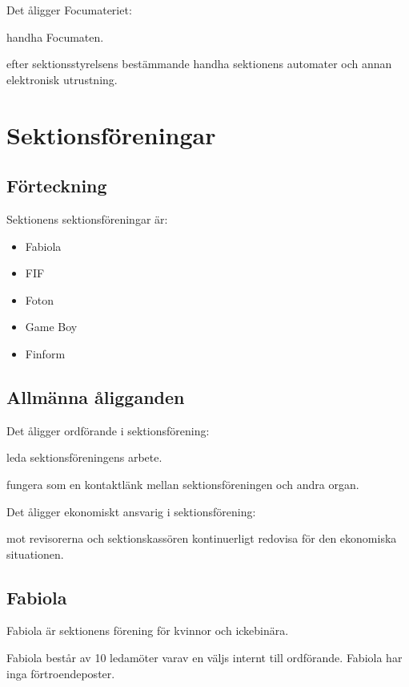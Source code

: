 \documentclass{styrdokument}
\begin{document}
\? Det åligger Focumateriet:
\begin{aligganden}
    \item handha Focumaten.
    \item efter sektionsstyrelsens bestämmande handha sektionens automater och annan elektronisk utrustning.
\end{aligganden}

\section{Sektionsföreningar}
\subsection{Förteckning}
\? Sektionens sektionsföreningar är:
\begin{itemize}
    \item Fabiola
	\item FIF
	\item Foton
	\item Game Boy
	\item Finform
\end{itemize}

\subsection{Allmänna åligganden}
\? Det åligger ordförande i sektionsförening:
\begin{aligganden}
    \item leda sektionsföreningens arbete.
    \item fungera som en kontaktlänk mellan sektionsföreningen och andra organ.
\end{aligganden}

\? Det åligger ekonomiskt ansvarig i sektionsförening:
\begin{aligganden}
    \item mot revisorerna och sektionskassören kontinuerligt redovisa för den ekonomiska situationen.
\end{aligganden}

\subsection{Fabiola}
\? Fabiola är sektionens förening för kvinnor och ickebinära.

\? Fabiola består av 10 ledamöter varav en väljs internt till ordförande. Fabiola har inga förtroendeposter.
		
\end{document}
